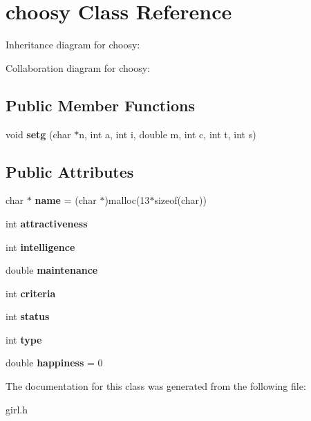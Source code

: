 \hypertarget{classchoosy}{}\section{choosy Class Reference}
\label{classchoosy}


Inheritance diagram for choosy\+:


Collaboration diagram for choosy\+:
\subsection*{Public Member Functions}
\begin{DoxyCompactItemize}
\item 
void {\bfseries setg} (char $\ast$n, int a, int i, double m, int c, int t, int s)\hypertarget{classchoosy_a1ff0706ee1d20f13b02a557e61e421ab}{}\label{classchoosy_a1ff0706ee1d20f13b02a557e61e421ab}

\end{DoxyCompactItemize}
\subsection*{Public Attributes}
\begin{DoxyCompactItemize}
\item 
char $\ast$ {\bfseries name} = (char $\ast$)malloc(13$\ast$sizeof(char))\hypertarget{classchoosy_a7af0279a2b1f6079c1bab98af6455fdc}{}\label{classchoosy_a7af0279a2b1f6079c1bab98af6455fdc}

\item 
int {\bfseries attractiveness}\hypertarget{classchoosy_a4e0d1fb6c980f74092cee42df54cd466}{}\label{classchoosy_a4e0d1fb6c980f74092cee42df54cd466}

\item 
int {\bfseries intelligence}\hypertarget{classchoosy_ae2f783ffcb79bab2adf439adff2fa425}{}\label{classchoosy_ae2f783ffcb79bab2adf439adff2fa425}

\item 
double {\bfseries maintenance}\hypertarget{classchoosy_a379eba6091a3cfefcf8be30e95b931c4}{}\label{classchoosy_a379eba6091a3cfefcf8be30e95b931c4}

\item 
int {\bfseries criteria}\hypertarget{classchoosy_a8fb4a3a75084b7fb938af9eaaefb829a}{}\label{classchoosy_a8fb4a3a75084b7fb938af9eaaefb829a}

\item 
int {\bfseries status}\hypertarget{classchoosy_a0ee01318e7bb7d02eeb0ff22d1998ec4}{}\label{classchoosy_a0ee01318e7bb7d02eeb0ff22d1998ec4}

\item 
int {\bfseries type}\hypertarget{classchoosy_a548706e548ef0f4f414f93204da78753}{}\label{classchoosy_a548706e548ef0f4f414f93204da78753}

\item 
double {\bfseries happiness} = 0\hypertarget{classchoosy_a98262ac5c0ac573af73cd29a43493fec}{}\label{classchoosy_a98262ac5c0ac573af73cd29a43493fec}

\end{DoxyCompactItemize}


The documentation for this class was generated from the following file\+:\begin{DoxyCompactItemize}
\item 
girl.\+h\end{DoxyCompactItemize}
